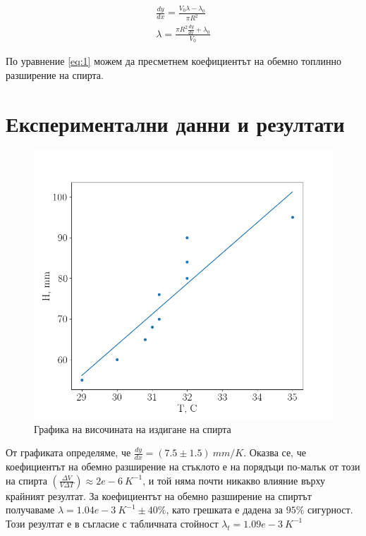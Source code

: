 \documentclass[%
 reprint,
 amsmath,amssymb,
 aps,
]{revtex4-2}
\begin{document}
\begin{gather*}
    \frac{dy}{dx} = \frac{V_0 \lambda - \lambda_0}{\pi R^2} \\
    \lambda = \frac{\pi R^2 \frac{dy}{dx} + \lambda_0}{V_0} \label{eq:1} \tag{1}
\end{gather*}

По уравнение \eqref{eq:1} можем да пресметнем коефициентът на обемно топлинно разширение на спирта.

\section{Експериментални данни и резултати}

\begin{figure}[H]
    \centering
    \includegraphics[width=0.9\columnwidth, keepaspectratio=true]{Figure_1.png}
    \caption{Графика на височината на издигане на спирта}
\end{figure}

От графиката определяме, че $\frac{dy}{dx} = (7.5 \pm 1.5) \ \si{mm/K}$. Оказва се, че коефициентът на обемно разширение на стъклото е на порядъци по-малък от този на спирта $(\frac{\Delta V}{V \Delta T}) \approx 2e-6 \ \si{K^{-1}}$, и той няма почти никакво влияние върху крайният резултат. За коефициентът на обемно разширение на спиртът получаваме $\lambda = 1.04e-3 \ \si{K^{-1}} \pm 40\%$, като грешката е дадена за $95\%$ сигурност. Този резултат е в съгласие с табличната стойност $\lambda_t = 1.09e-3 \ \si{K^{-1}}$
\end{document}
